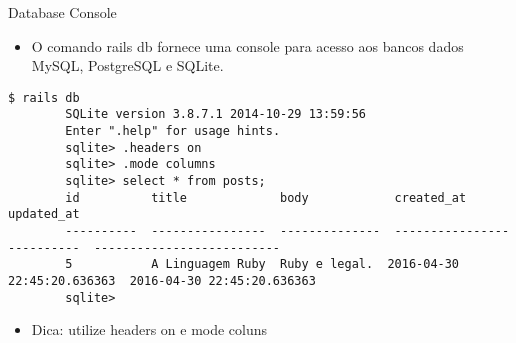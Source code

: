 
\begin{frame}[t, fragile]{Database Console}
	\begin{itemize}
		\item O comando \alert{rails db} fornece uma console para acesso aos bancos dados
		MySQL, PostgreSQL e SQLite.
	\end{itemize}
	
	\begin{lstlisting}[style=BashInputBasicStyle, basicstyle=\tiny\ttfamily,  keepspaces=true]
		$ rails db
		SQLite version 3.8.7.1 2014-10-29 13:59:56
		Enter ".help" for usage hints.
		sqlite> .headers on
		sqlite> .mode columns
		sqlite> select * from posts;
		id          title             body            created_at                  updated_at                
		----------  ----------------  --------------  --------------------------  --------------------------
		5           A Linguagem Ruby  Ruby e legal.  2016-04-30 22:45:20.636363  2016-04-30 22:45:20.636363
		sqlite> 
	\end{lstlisting}
	
	\begin{itemize}
		\item Dica: utilize \alert{headers on} e \alert{mode coluns}
	\end{itemize}
	
\end{frame}

